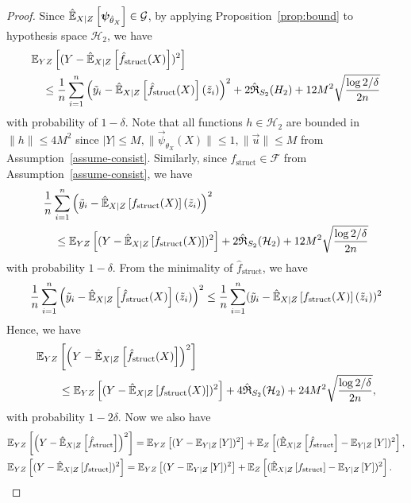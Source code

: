 \begin{proof}
Since $\hatexpect[X|Z]{\vec{\psi}_{\hat{\theta}_X}} \in \mathcal{G}$, by applying Proposition~\ref{prop:bound} to hypothesis space $\mathcal{H}_2$, we have
\begin{align*}
    &\expect[YZ]{(Y - \hatexpect[X|Z]{\hat{f}_{\mathrm{struct}}(X)})^2} \\
    &\quad \leq  \frac1n \sum_{i=1}^n {\left(\tilde{y}_i - \hatexpect[X|Z]{\hat{f}_{\mathrm{struct}}(X)}(\tilde z_i)\right)^2} +  2\hat{\mathfrak{R}}_{S_2}(H_2) + 12M^2\sqrt{\frac{\log 2/\delta}{2n}}
\end{align*}
with probability of $1-\delta$. Note that all functions $h \in \mathcal{H}_2$ are bounded in $\|h\| \leq 4M^2$ since $|Y|\leq M, \|\vec{\psi}_{\theta_X}(X)\| \leq 1, \|\vec{u}\| \leq M$ from Assumption~\ref{assume-consist}.
Similarly, since $f_{\mathrm{struct}}\in \mathcal{F}$ from Assumption~\ref{assume-consist}, we have
\begin{align*}
    &\frac1n \sum_{i=1}^n \left(\tilde{y}_i - \hatexpect[X|Z]{f_{\mathrm{struct}}(X)}(\tilde z_i)\right)^2 \\
    &\quad \leq  \expect[YZ]{(Y - \hatexpect[X|Z]{f_{\mathrm{struct}}(X)})^2} +  2\hat{\mathfrak{R}}_{S_2}(\mathcal{H}_2) + 12M^2\sqrt{\frac{\log 2/\delta}{2n}}
\end{align*}
with probability $1-\delta$. From the minimality of $\hat{f}_{\mathrm{struct}}$, we have 
\begin{align*}
    \frac1n \sum_{i=1}^n {\left(\tilde y_i - \hatexpect[X|Z]{\hat{f}_{\mathrm{struct}}(X)}(\tilde z_i)\right)^2} \leq  \frac1n \sum_{i=1}^n (\tilde{y}_i - \hatexpect[X|Z]{f_{\mathrm{struct}}(X)}(\tilde z_i))^2
\end{align*}
Hence, we have
\begin{align*}
    &\expect[YZ]{\left(Y - \hatexpect[X|Z]{\hat{f}_{\mathrm{struct}}(X)}\right)^2} \\
    &\quad\quad \leq \expect[YZ]{(Y - \hatexpect[X|Z]{f_{\mathrm{struct}}(X)})^2} +  4\hat{\mathfrak{R}}_{S_2}(\mathcal{H}_2) + 24M^2\sqrt{\frac{\log 2/\delta}{2n}},
\end{align*}
with probability $1-2\delta$.
Now we also have 
\begin{align*}
    &\expect[YZ]{\left(Y - \hatexpect[X|Z]{\hat{f}_{\mathrm{struct}}}\right)^2} = \expect[YZ]{(Y - \expect[Y|Z]{Y})^2} + \expect[Z]{(\hatexpect[X|Z]{\hat{f}_{\mathrm{struct}}} - \expect[Y|Z]{Y})^2},\\
    &\expect[YZ]{(Y - \hatexpect[X|Z]{f_{\mathrm{struct}}})^2} = \expect[YZ]{(Y - \expect[Y|Z]{Y})^2} + \expect[Z]{(\hatexpect[X|Z]{{f}_{\mathrm{struct}}} - \expect[Y|Z]{Y})^2}.

\end{align*}
\end{proof}

